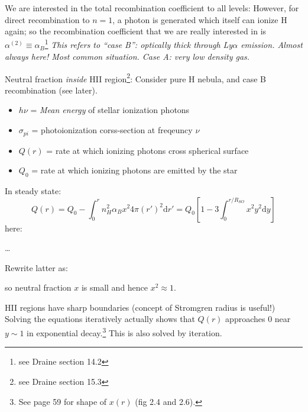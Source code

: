 \documentclass[12pt]{article}
\newcommand{\mar}[1]{\hspace{0pt}\marginpar{-\textcolor{black}{#1}-}}
\newcommand{\mynotes}[1]{{\fontfamily{cmss}\selectfont \textit{#1}}}
\begin{document}
We are interested in the total recombination coefficient to all levels:
However, for direct recombination
to $ n=1 $, a photon is generated which itself can ionize H again; so the
recombination coefficient that we are really interested in is
$\alpha^{(2)} \equiv \alpha_{B}$\footnote{see Draine section 14.2}
\mynotes{This refers to ``case B'': optically thick through Ly$\alpha$
emission. Almost always here! Most common situation. Case A: very low
density gas.}

\mar{56}Neutral fraction \emph{inside} HII region\footnote{see Draine
section 15.3}: Consider pure H nebula, and case B recombination (see
later).
\begin{itemize}
    \item $h\nu$ = \emph{Mean energy} of stellar ionization photons
    \item $\sigma_{pi}$ = photoionization corss-section at freqeuncy $\nu$
    \item $Q(r)$ = rate at which ionizing photons cross spherical surface
    \item $Q_{0}$ = rate at which ionizing photons are emitted by the star
\end{itemize}
In steady state:
\[
    Q(r)
    = Q_{0} - \int_{0}^{r}{
        n_{H}^{2} \alpha_{B} x^{2} 4\pi(r')^{2} \mathrm{d}r'}
    = Q_{0} \left[ 1 - 3\int_{0}^{r/R_{SO}}{
        x^{2}y^{2} \mathrm{d}y} \right]
    \]
here:

\ldots

\mar{57}Rewrite latter as:

so neutral fraction $x$ is small and hence $x^{2} \approx 1$.

HII regions have sharp boundaries (concept of Stromgren radius is useful!)
Solving the equations iteratively actually shows that $Q(r)$ approaches 0
near $ y \sim 1 $ in exponential decay.\footnote{
    See page 59 for shape of $x(r)$ (fig 2.4 and 2.6).}
This is also solved by iteration.
\end{document}
